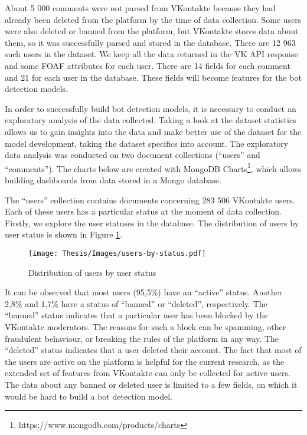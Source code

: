 About 5 000 comments were not parsed from VKontakte because they had already been deleted from the platform by the time of data collection. Some users were also deleted or banned from the platform, but VKontakte stores data about them, so it was successfully parsed and stored in the database. There are 12 963 such users in the dataset. We keep all the data returned in the VK API response and some FOAF attributes for each user. There are 14 fields for each comment and 21 for each user in the database. These fields will become features for the bot detection models.

In order to successfully build bot detection models, it is necessary to conduct an exploratory analysis of the data collected. Taking a look at the dataset statistics allows us to gain insights into the data and make better use of the dataset for the model development, taking the dataset specifics into account. The exploratory data analysis was conducted on two document collections (``users'' and ``comments''). The charts below are created with MongoDB Charts\footnote{https://www.mongodb.com/products/charts}, which allows building dashboards from data stored in a Mongo database.

The ``users'' collection contains documents concerning 283 506 VKontakte users. Each of these users has a particular status at the moment of data collection. Firstly, we explore the user statuses in the database. The distribution of users by user status is shown in Figure \ref{fig:users-by-status}.

\begin{figure}
	\centering
	\texttt{[image: Thesis/Images/users-by-status.pdf]}
	\caption{Distribution of users by user status}
	\label{fig:users-by-status}
\end{figure}

It can be observed that most users (95,5\%) have an ``active'' status. Another 2,8\% and 1,7\% have a status of ``banned'' or ``deleted'', respectively. The ``banned'' status indicates that a particular user has been blocked by the VKontakte moderators. The reasons for such a block can be spamming, other fraudulent behaviour, or breaking the rules of the platform in any way. The ``deleted'' status indicates that a user deleted their account. The fact that most of the users are active on the platform is helpful for the current research, as the extended set of features from VKontakte can only be collected for active users. The data about any banned or deleted user is limited to a few fields, on which it would be hard to build a bot detection model.

